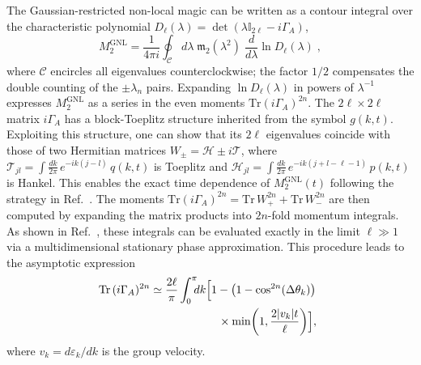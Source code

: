 \documentclass[prx,twocolumn,superscriptaddress,aps,10pt, frontmatterverbose, reprint,footinbib,longbibliography=true]{revtex4-2}
\begin{document}
The Gaussian-restricted non-local magic can be written as a contour integral over the characteristic polynomial $D_\ell(\lambda) = \det(\lambda \mathbb{I}_{2\ell} - i\Gamma_A)$,
\begin{equation}
    M_2^{\mathrm{GNL}} = \frac{1}{4\pi i}\oint_\mathcal{C}d\lambda\;\mathfrak{m}_2(\lambda^2)\;\frac{d}{d\lambda}\ln D_\ell(\lambda)\;,\label{eq:circccc}
\end{equation}
where $\mathcal{C}$ encircles all eigenvalues counterclockwise; the factor $1/2$ compensates the double counting of the $\pm\lambda_n$ pairs.
Expanding $\ln D_\ell(\lambda)$ in powers of $\lambda^{-1}$ expresses $M_2^{\mathrm{GNL}}$ as a series in the even moments $\mathrm{Tr}(i\Gamma_A)^{2n}$.
The $2\ell \times 2\ell$ matrix $i\Gamma_A$ has a block-Toeplitz structure inherited from the symbol $g(k,t)$.
Exploiting this structure, one can show that its $2\ell$ eigenvalues coincide with those of two Hermitian matrices $W_\pm = \mathcal{H} \pm i\mathcal{T}$, where $\mathcal{T}_{jl} = \int \frac{dk}{2\pi}\,e^{-ik(j-l)}\,q(k,t)$ is Toeplitz and $\mathcal{H}_{jl} = \int \frac{dk}{2\pi}\,e^{-ik(j+l-\ell-1)}\,p(k,t)$ is Hankel. This enables the exact time dependence of $M_2^\mathrm{GNL}(t)$ following the strategy in Ref.~\cite{Fagotti2008}. 
The moments $\mathrm{Tr}(i\Gamma_A)^{2n} = \mathrm{Tr}\,W_+^{2n} + \mathrm{Tr}\,W_-^{2n}$ are then computed by expanding the matrix products into $2n$-fold momentum integrals.
As shown in Ref.~\cite{Fagotti2008}, these integrals can be evaluated exactly in the limit $\ell \gg 1$ via a multidimensional stationary phase approximation.
This procedure leads to the asymptotic expression\begin{equation}
\begin{split}
   \!\!\! \mathrm{Tr}\,(i\Gamma_A)^{2n}&\simeq \frac{2\ell}{\pi}\int_0^\pi\!\!\!dk\Bigl[1-\bigl(1-\cos^{2n}(\Delta\theta_k)\bigr)\\
   &\qquad\qquad\qquad\times\min\!\left(1, \frac{2|v_k|t}{\ell}\right)\Bigr],
\end{split}
\label{eq:moments_asymptotic}
\end{equation}
where $v_k = d\varepsilon_k/dk$ is the group velocity.
\end{document}
